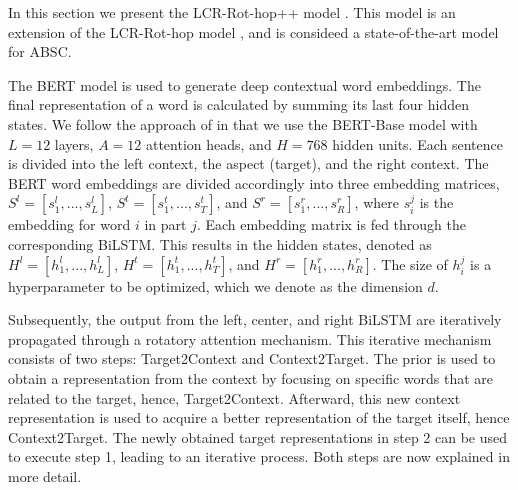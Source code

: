 \documentclass[runningheads]{llncs}
\begin{document}
In this section we present the LCR-Rot-hop++ model \cite{Trusca2020}. This model is an extension of the LCR-Rot-hop model \cite{Wallaart2019}, and is consideed a state-of-the-art model for ABSC.

The BERT model is used to generate deep contextual word embeddings. The final representation of a word is calculated by summing its last four hidden states. We follow the approach of \cite{Trusca2020} in that we use the BERT-Base model with $L=12$ layers, $A=12$ attention heads, and $H=768$ hidden units. Each sentence is divided into the left context, the aspect (target), and the right context. The BERT word embeddings are divided accordingly into three embedding matrices, $S^l = [s_1^l,...,s_L^l]$, $S^t = [s_1^t,...,s_T^t]$, and $S^r = [s_1^r,...,s_R^r]$, where $s_i^j$ is the embedding for word $i$ in part $j$. Each embedding matrix is fed through the corresponding BiLSTM. This results in the hidden states, denoted as $H^l = [h_1^l,...,h_L^l]$, $H^t = [h_1^t,...,h_T^t]$, and $H^r = [h_1^r,...,h_R^r]$. The size of $h_i^j$ is a hyperparameter to be optimized, which we denote as the dimension $d$. 

Subsequently, the output from the left, center, and right BiLSTM are iteratively propagated through a rotatory attention mechanism. This iterative mechanism consists of two steps: Target2Context and Context2Target. The prior is used to obtain a representation from the context by focusing on specific words that are related to the target, hence, Target2Context. Afterward, this new context representation is used to acquire a better representation of the target itself, hence Context2Target. The newly obtained target representations in step 2 can be used to execute step 1, leading to an iterative process. Both steps are now explained in more detail.
\end{document}
